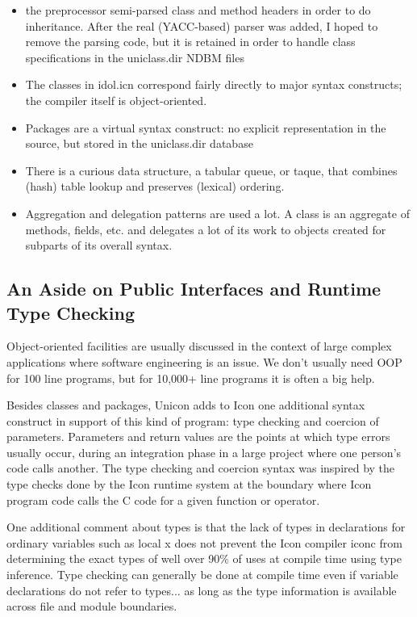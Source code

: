 \liststyleLxliv
\begin{itemize}
\item 
the preprocessor semi-parsed class and method headers in order to do inheritance. After the real (YACC-based) parser was
added, I hoped to remove the parsing code, but it is retained in order to handle class specifications in the
uniclass.dir NDBM files 
\item 
The classes in idol.icn correspond fairly directly to major syntax constructs; the compiler itself is object-oriented. 
\item 
Packages are a {\textquotedbl}virtual syntax construct{\textquotedbl}: no explicit representation in the source, but
stored in the uniclass.dir database 
\item 
There is a curious data structure, a tabular queue, or taque, that combines (hash) table lookup and preserves (lexical)
ordering. 
\item 
Aggregation and delegation patterns are used a lot. A class is an aggregate of methods, fields, etc. and delegates a lot
of its work to objects created for subparts of its overall syntax. 
\end{itemize}

\subsection{An Aside on Public Interfaces and Runtime Type Checking}

Object-oriented facilities are usually discussed in the context of
large complex applications where software engineering is an issue. We
don't usually need OOP for 100 line programs, but for 10,000+ line
programs it is often a big help.

Besides classes and packages, Unicon adds to Icon one additional
syntax construct in support of this kind of program: type checking and
coercion of parameters. Parameters and return values are the points at
which type errors usually occur, during an integration phase in a
large project where one person's code calls another. The type checking
and coercion syntax was inspired by the type checks done by the Icon
runtime system at the boundary where Icon program code calls the C
code for a given function or operator.


One additional comment about types is that the lack of types in
declarations for ordinary variables such as {\textquotedbl}local
x{\textquotedbl} does not prevent the Icon compiler iconc from
determining the exact types of well over 90\% of uses at compile time
using type inference. Type checking can generally be done at compile
time even if variable declarations do not refer to types... as long as
the type information is available across file and module boundaries.
